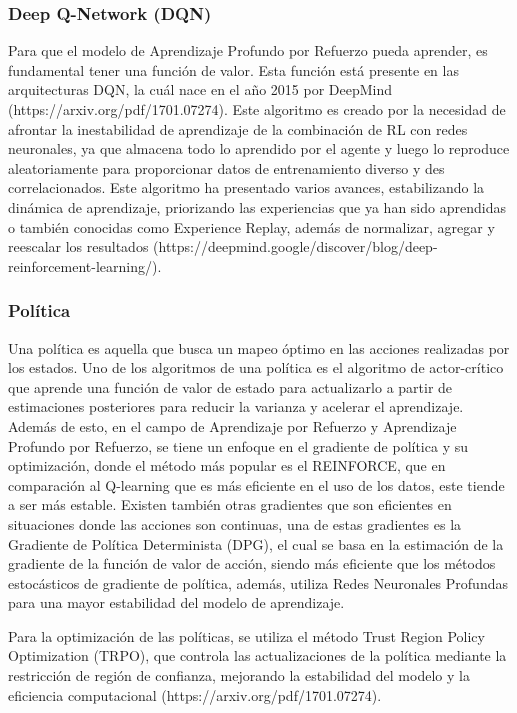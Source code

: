 \subsubsection{Deep Q-Network (DQN)}
Para que el modelo de Aprendizaje Profundo por Refuerzo pueda aprender, es fundamental tener una función de valor. Esta función está presente en las arquitecturas DQN, la cuál nace en el año 2015 por DeepMind (https://arxiv.org/pdf/1701.07274). Este algoritmo es creado por la necesidad de afrontar la inestabilidad de aprendizaje de la combinación de RL con redes neuronales, ya que almacena todo lo aprendido por el agente y luego lo reproduce aleatoriamente para proporcionar datos de entrenamiento diverso y des correlacionados. Este algoritmo ha presentado varios avances, estabilizando la dinámica de aprendizaje, priorizando las experiencias que ya han sido aprendidas o también conocidas como Experience Replay, además de normalizar, agregar y reescalar los resultados (https://deepmind.google/discover/blog/deep-reinforcement-learning/). 

\subsubsection{Política}

Una política es aquella que busca un mapeo óptimo en las acciones realizadas por los estados. Uno de los algoritmos de una política es el algoritmo de actor-crítico que aprende una función de valor de estado para actualizarlo a partir de estimaciones posteriores para reducir la varianza y acelerar el aprendizaje. Además de esto, en el campo de Aprendizaje por Refuerzo y Aprendizaje Profundo por Refuerzo, se tiene un enfoque en el gradiente de política y su optimización, donde el método más popular es el REINFORCE, que en comparación al Q-learning que es más eficiente en el uso de los datos, este tiende a ser más estable. Existen también otras gradientes que son eficientes en situaciones donde las acciones son continuas, una de estas gradientes es la Gradiente de Política Determinista (DPG), el cual se basa en la estimación de la gradiente de la función de valor de acción, siendo más eficiente que los métodos estocásticos de gradiente de política, además, utiliza Redes Neuronales Profundas para una mayor estabilidad del modelo de aprendizaje.

Para la optimización de las políticas, se utiliza el método Trust Region Policy Optimization (TRPO), que controla las actualizaciones de la política mediante la restricción de región de confianza, mejorando la estabilidad del modelo y la eficiencia computacional (https://arxiv.org/pdf/1701.07274). 

